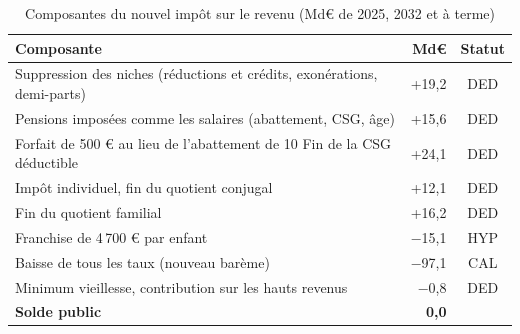 \begin{table}[!htbp]\small\setlength{\tabcolsep}{4pt}
\caption{Composantes du nouvel impôt sur le revenu (Md€ de 2025, 2032 et à terme)}\label{tab:t2}
\begin{tabularx}{\linewidth}{@{}Xrc@{}}
\toprule
\textbf{Composante} & \textbf{Md€} & \textbf{Statut} \\
\midrule
Suppression des niches (réductions et crédits, exonérations, demi-parts) & +19,2 & DED \\
Pensions imposées comme les salaires (abattement, CSG, âge) & +15,6 & DED \\
Forfait de 500 € au lieu de l'abattement de 10 %
Fin de la CSG déductible & +24,1 & DED \\
Impôt individuel, fin du quotient conjugal & +12,1 & DED \\
Fin du quotient familial & +16,2 & DED \\
Franchise de 4\,700 € par enfant & $-$15,1 & HYP \\
Baisse de tous les taux (nouveau barème) & $-$97,1 & CAL \\
Minimum vieillesse, contribution sur les hauts revenus & $-$0,8 & DED \\
\midrule \textbf{Solde public} & \textbf{0,0} & \\
\bottomrule
\end{tabularx}
\par{}
\end{table}
